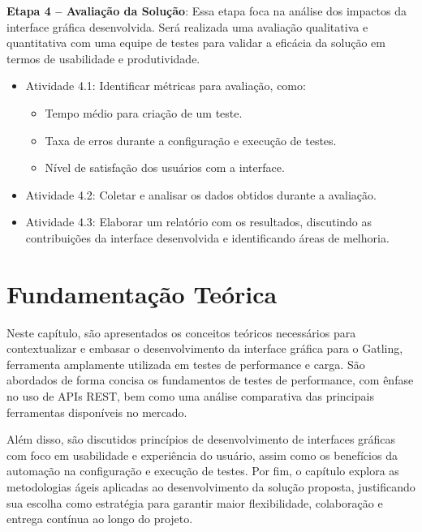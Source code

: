 \documentclass[
	12pt,
	openright,
	twoside,
	a4paper,
	english,
	brazil
	]{abntex2}
\begin{document}
\textbf{Etapa 4 -- Avaliação da Solução}: Essa etapa foca na análise dos impactos da interface gráfica desenvolvida. Será realizada uma avaliação qualitativa e quantitativa com uma equipe de testes para validar a eficácia da solução em termos de usabilidade e produtividade.

\begin{itemize}
  \item[] Atividade 4.1: Identificar métricas para avaliação, como:
    \begin{itemize}
      \item Tempo médio para criação de um teste.
      \item Taxa de erros durante a configuração e execução de testes.
      \item Nível de satisfação dos usuários com a interface.
    \end{itemize}
  \item[] Atividade 4.2: Coletar e analisar os dados obtidos durante a avaliação.
  \item[] Atividade 4.3: Elaborar um relatório com os resultados, discutindo as contribuições da interface desenvolvida e identificando áreas de melhoria.
\end{itemize}



\chapter{Fundamentação Teórica} %

Neste capítulo, são apresentados os conceitos teóricos necessários para contextualizar e embasar o desenvolvimento da interface gráfica para o Gatling, ferramenta amplamente utilizada em testes de performance e carga. São abordados de forma concisa os fundamentos de testes de performance, com ênfase no uso de APIs REST, bem como uma análise comparativa das principais ferramentas disponíveis no mercado.

Além disso, são discutidos princípios de desenvolvimento de interfaces gráficas com foco em usabilidade e experiência do usuário, assim como os benefícios da automação na configuração e execução de testes. Por fim, o capítulo explora as metodologias ágeis aplicadas ao desenvolvimento da solução proposta, justificando sua escolha como estratégia para garantir maior flexibilidade, colaboração e entrega contínua ao longo do projeto.
\end{document}
